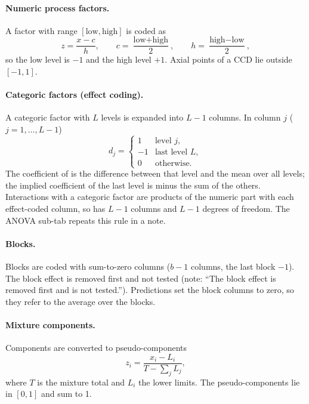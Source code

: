 \paragraph{Numeric process factors.} A factor with range $[\text{low},\text{high}]$ is coded as
\begin{equation}
  z=\frac{x-c}{h},\qquad c=\frac{\text{low}+\text{high}}{2},\qquad h=\frac{\text{high}-\text{low}}{2},
  \label{eq:ch05-coding}
\end{equation}
so the low level is $-1$ and the high level $+1$. Axial points of a CCD lie outside $[-1,1]$.

\paragraph{Categoric factors (effect coding).} A categoric factor with $L$ levels is expanded into $L-1$
columns. In column $j$ ($j=1,\dots,L-1$)
\begin{equation}
  d_j=\begin{cases}1 & \text{level } j,\\ -1 & \text{last level } L,\\ 0 & \text{otherwise.}\end{cases}
  \label{eq:ch05-effectcode}
\end{equation}
The coefficient of  is the difference between that level and the mean over all levels; the
implied coefficient of the last level is minus the sum of the others. Interactions with a categoric factor
are products of the numeric part with each effect-coded column, so  has $L-1$ columns and $L-1$
degrees of freedom. The ANOVA sub-tab repeats this rule in a note.

\paragraph{Blocks.} Blocks are coded with sum-to-zero columns ($b-1$ columns, the last block $-1$). The
block effect is removed first and not tested (note: ``The block effect is removed first and is not
tested.''). Predictions set the block columns to zero, so they refer to the average over the blocks.

\paragraph{Mixture components.} Components are converted to pseudo-components
\begin{equation}
  z_i=\frac{x_i-L_i}{T-\sum_j L_j},
  \label{eq:ch05-pseudo}
\end{equation}
where $T$ is the mixture total and $L_i$ the lower limits. The pseudo-components lie in $[0,1]$ and sum to 1.

